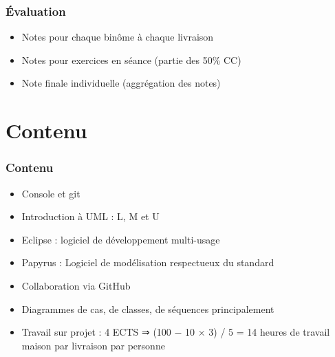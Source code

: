 \documentclass[french]{beamer}
\begin{document}
\begin{frame}
	\frametitle{Évaluation}
	\begin{itemize}
		\item Notes pour chaque binôme à chaque livraison
		\item Notes pour exercices en séance (partie des 50\% CC)
		\item Note finale individuelle (aggrégation des notes)
	\end{itemize}
\end{frame}

\section{Contenu}
\begin{frame}
	\frametitle{Contenu}
	\begin{itemize}
		\item Console et git
		\item Introduction à UML : L, M et U
		\item Eclipse : logiciel de développement multi-usage
		\item Papyrus : Logiciel de modélisation respectueux du standard
		\item Collaboration via GitHub
		\item Diagrammes de cas, de classes, de séquences principalement
		\item Travail sur projet : 4 ECTS ⇒ (100 − 10 × 3) / 5 = 14 heures de travail maison par livraison par personne
	\end{itemize}
\end{frame}
\end{document}
